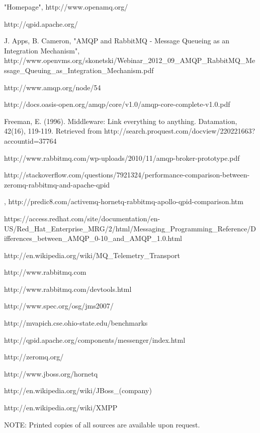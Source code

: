 \documentclass{thesis}
\begin{document}
\begin{singlespace}
\begin{thebibliography}{99}
 "Homepage", http://www.openamq.org/

 http://qpid.apache.org/

 J. Apps, B. Cameron, "AMQP and RabbitMQ - Message Queueing as an Integration Mechanism", http://www.openvms.org/skonetski/Webinar_2012_09_AMQP_RabbitMQ_Message_Queuing_as_Integration_Mechanism.pdf

 http://www.amqp.org/node/54

 http://docs.oasis-open.org/amqp/core/v1.0/amqp-core-complete-v1.0.pdf

 Freeman, E. (1996). Middleware: Link everything to anything. Datamation, 42(16), 119-119. Retrieved from http://search.proquest.com/docview/220221663?accountid=37764

 http://www.rabbitmq.com/wp-uploads/2010/11/amqp-broker-prototype.pdf

 http://stackoverflow.com/questions/7921324/performance-comparison-between-zeromq-rabbitmq-and-apache-qpid

 , http://predic8.com/activemq-hornetq-rabbitmq-apollo-qpid-comparison.htm

 https://access.redhat.com/site/documentation/en-US/Red_Hat_Enterprise_MRG/2/html/Messaging_Programming_Reference/Differences_between_AMQP_0-10_and_AMQP_1.0.html

 http://en.wikipedia.org/wiki/MQ_Telemetry_Transport

 http://www.rabbitmq.com

 http://www.rabbitmq.com/devtools.html

 http://www.spec.org/osg/jms2007/

 http://mvapich.cse.ohio-state.edu/benchmarks

 http://qpid.apache.org/components/messenger/index.html

 http://zeromq.org/

 http://www.jboss.org/hornetq

 http://en.wikipedia.org/wiki/JBoss_(company)

 http://en.wikipedia.org/wiki/XMPP

NOTE: Printed copies of all sources are available upon request. 

\end{thebibliography}
\end{singlespace}
\end{document}
